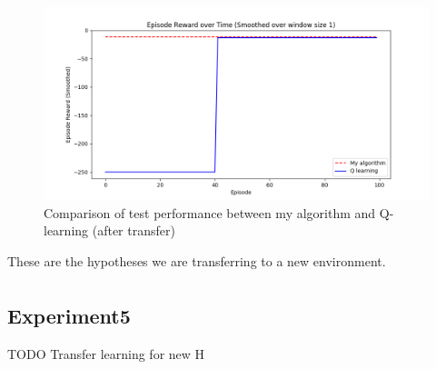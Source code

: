 \begin{figure}[!htb]
\centering
\includegraphics[width=1.0\textwidth]{./figures/experiment4_after_test}
\caption{Comparison of test performance between my algorithm and Q-learning (after transfer)}
\label{experiment3_test}
\end{figure}

These are the hypotheses we are transferring to a new environment. 
\begin{equation*}
\begin{split}
\end{split}
\end{equation*}

\newpage
\subsection{Experiment5}

TODO Transfer learning for new H







